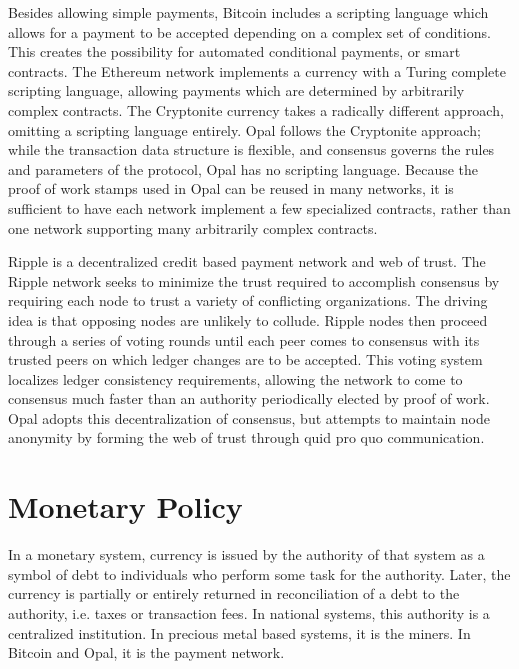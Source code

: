 \documentclass[10pt,twocolumn]{article}
\begin{document}
Besides allowing simple payments, Bitcoin includes a scripting language which allows for a payment to be accepted depending on a complex set of conditions.  This creates the possibility for automated conditional payments, or smart contracts.  The Ethereum \cite{bute14, wood14} network implements a currency with a Turing complete scripting language, allowing payments which are determined by arbitrarily complex contracts.  The Cryptonite \cite{bruc13} currency takes a radically different approach, omitting a scripting language entirely.  Opal follows the Cryptonite approach; while the transaction data structure is flexible, and consensus governs the rules and parameters of the protocol, Opal has no scripting language.  Because the proof of work stamps used in Opal can be reused in many networks, it is sufficient to have each network implement a few specialized contracts, rather than one network supporting many arbitrarily complex contracts.

Ripple \cite{fugg04} is a decentralized credit based payment network and web of trust.  The Ripple network seeks to minimize the trust required to accomplish consensus by requiring each node to trust a variety of conflicting organizations.  The driving idea is that opposing nodes are unlikely to collude.  Ripple nodes then proceed through a series of voting rounds until each peer comes to consensus with its trusted peers on which ledger changes are to be accepted.  This voting system localizes ledger consistency requirements, allowing the network to come to consensus much faster than an authority periodically elected by proof of work.  Opal adopts this decentralization of consensus, but attempts to maintain node anonymity by forming the web of trust through quid pro quo communication.

\section{Monetary Policy}
In a monetary system, currency is issued by the authority of that system as a symbol of debt to individuals who perform some task for the authority.  Later, the currency is partially or entirely returned in reconciliation of a debt to the authority, i.e. taxes or transaction fees.  In national systems, this authority is a centralized institution.  In precious metal based systems, it is the miners.  In Bitcoin and Opal, it is the payment network.
\end{document}
